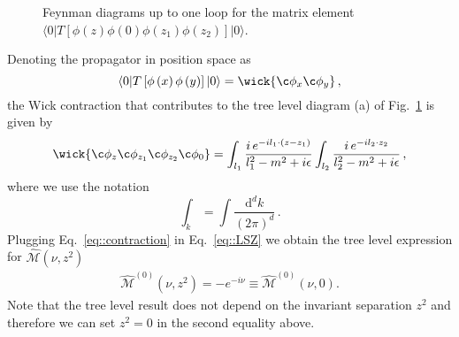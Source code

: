 \begin{figure}[h]
        \vspace*{5mm}
        \caption{Feynman diagrams up to one loop for the matrix element \\ 
        $\langle 0 | T\left[\phi\left(z\right)\phi\left(0\right)\phi\left(z_1\right)\phi\left(z_2\right)\right]|0\rangle $.}
        \label{fig:f_diag_2}
\end{figure}
%
Denoting the propagator in position space as
\begin{equation}
        \langle 0 | T\left[\phi\left(x\right)\phi\left(y\right)\right]|0\rangle = \wick{\c \phi_x \c \phi_{y} }   \, ,     
\end{equation}
the Wick contraction that contributes to the tree level diagram (a) of Fig.~\ref{fig:f_diag_2} is given by 
\begin{align}
\label{eq::contraction}
        \wick{\c \phi_z \c \phi_{z_1} \c \phi_{z_2} \c \phi_{0}}=
        \int_{l_1} \frac{i \, e^{-i l_1 \cdot \left(z-z_1\right)}}{l_1^2 -m^2 + i\epsilon} \int_{l_2} 
        \frac{i\,e^{-i l_2 \cdot z_2}}{l_2^2 -m^2 + i\epsilon}\, ,
\end{align}
where we use the notation
\begin{equation}
        \int_k = \int \frac{\mathrm{d}^dk}{(2\pi)^d}\, .
\end{equation}
Plugging Eq.~\eqref{eq::contraction} in Eq.~\eqref{eq::LSZ} we obtain the tree
level expression for $\widehat{\mathcal{M}}\left(\nu, z^2\right)$
\begin{align}
\label{eq::treelevel}
        \widehat{\mathcal{M}}^{(0)}\left(\nu, z^2\right) = - e^{-i \nu} \equiv \widehat{\mathcal{M}}^{(0)}\left(\nu, 0\right) .
\end{align}
Note that the tree level result does not depend on the invariant separation $z^2$ and therefore we can set $z^2=0$ in the second equality above.


